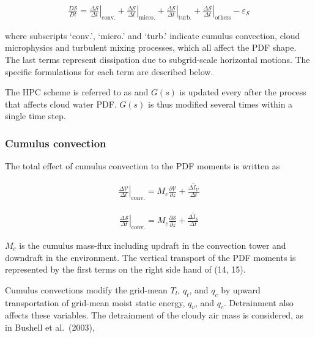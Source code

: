 \begin{eqnarray}
\frac{D \mathcal{S}}{D t}=\left.\frac{\Delta \mathcal{S}}{\Delta t}\right|_{\mathrm{conv.}}+\left.\frac{\Delta \mathcal{S}}{\Delta t}\right|_{\text {micro.}}+\left.\frac{\Delta \mathcal{S}}{\Delta t}
\right|_{\mathrm{turb.}}+\left.\frac{\Delta \mathcal{S}}{\Delta t}\right|_{\text {others}}-\varepsilon_{\mathcal{S}}
\end{eqnarray}

where subscripts `conv.', `micro.' and `turb.' indicate cumulus
convection, cloud microphysics and turbulent mixing processes, which all
affect the PDF shape. The last terms represent dissipation due to
subgrid-scale horizontal motions. The specific formulations for each
term are described below.

The HPC scheme is referred to as and \(G(s)\) is updated every after the
process that affects cloud water PDF. \(G(s)\) is thus modified several
times within a single time step.

\hypertarget{cumulus-convection}{%
\subsubsection{Cumulus convection}\label{cumulus-convection}}

The total effect of cumulus convection to the PDF moments is written as

\begin{eqnarray}
\left.\frac{\Delta \mathcal{V}}{\Delta t}\right|_{\mathrm{conv} .}=M_{c} \frac{\partial \mathcal{V}}{\partial z}+\frac{\Delta \tilde{I}_{\mathcal{V}}}{\Delta t}
\label{W09-14}
\end{eqnarray}

\begin{eqnarray}
\left.\frac{\Delta \mathcal{S}}{\Delta t}\right|_{\mathrm{conv} .}=M_{c} \frac{\partial \mathcal{S}}{\partial z}+\frac{\Delta \tilde{I}_{\mathcal{S}}}{\Delta t}
\label{W09-15}
\end{eqnarray}

\(M_c\) is the cumulus mass-flux including updraft in the convection
tower and downdraft in the environment. The vertical transport of the
PDF moments is represented by the first terms on the right side hand of
(14, 15).

Cumulus convections modify the grid-mean \(T_l\), \(q_t\), and \(q_c\)
by upward transportation of grid-mean moist static energy, \(q_v\), and
\(q_c\). Detrainment also affects these variables. The detrainment of
the cloudy air mass is considered, as in Bushell et al.~(2003),

